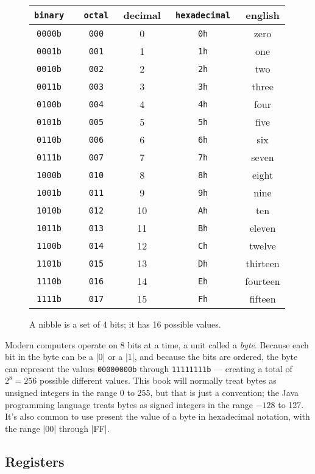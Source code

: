 

\begin{figure}
\begin{tabular}{>{\tt}c>{\tt}cc>{\tt}cc}
\textrm{binary} & \textrm{octal} & decimal & \textrm{hexadecimal} & english \\
\hline
0000b & 000 & 0 & 0h & zero \\
0001b & 001 & 1 & 1h & one \\
0010b & 002 & 2 & 2h & two \\
0011b & 003 & 3 & 3h & three \\
0100b & 004 & 4 & 4h & four \\
0101b & 005 & 5 & 5h & five \\
0110b & 006 & 6 & 6h & six \\
0111b & 007 & 7 & 7h & seven \\
1000b & 010 & 8 & 8h & eight \\
1001b & 011 & 9 & 9h & nine \\
1010b & 012 & 10& Ah & ten \\
1011b & 013 & 11& Bh & eleven \\
1100b & 014 & 12& Ch & twelve \\
1101b & 015 & 13& Dh & thirteen \\
1110b & 016 & 14& Eh & fourteen \\
1111b & 017 & 15& Fh & fifteen \\
\hline
\end{tabular}
\caption{A nibble is a set of 4 bits; it has 16 possible values.}\label{nibble}
\end{figure}

Modern computers operate on 8 bits at a time, a unit called a
\emph{byte}. Because each bit in the byte can be a |0| or a |1|, and
because the bits are ordered, the byte can represent the values
\texttt{00000000b} through \texttt{11111111b} --- creating a
total of $2^8=256$ possible different values. This book will normally treat
bytes as unsigned integers in the range 0 to 255, but that is just a
convention; the Java programming language treats bytes as signed
integers in the range $-128$ to 127. It's also common to use present
the value of a byte in hexadecimal notation, with the range |00|
through |FF|.

\subsection{Registers}

